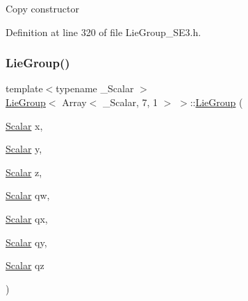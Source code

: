 Copy constructor 

Definition at line 320 of file Lie\+Group\+\_\+\+S\+E3.\+h.

\hypertarget{class_lie_group_3_01_array_3_01___scalar_00_017_00_011_01_4_01_4_aa26a8dec73f9a261d811ae4f31b7647f}{}\label{class_lie_group_3_01_array_3_01___scalar_00_017_00_011_01_4_01_4_aa26a8dec73f9a261d811ae4f31b7647f} 
\subsubsection{\texorpdfstring{Lie\+Group()}{LieGroup()}\hspace{0.1cm}{\footnotesize\ttfamily [4/6]}}
{\footnotesize\ttfamily template$<$typename \+\_\+\+Scalar $>$ \\
\hyperlink{class_lie_group}{Lie\+Group}$<$ Array$<$ \+\_\+\+Scalar, 7, 1 $>$ $>$\+::\hyperlink{class_lie_group}{Lie\+Group} (\begin{DoxyParamCaption}\item[{\hyperlink{class_lie_group_3_01_array_3_01___scalar_00_017_00_011_01_4_01_4_a5fd29a7be3621d5df2717d910d47b3ce}{Scalar}}]{x,  }\item[{\hyperlink{class_lie_group_3_01_array_3_01___scalar_00_017_00_011_01_4_01_4_a5fd29a7be3621d5df2717d910d47b3ce}{Scalar}}]{y,  }\item[{\hyperlink{class_lie_group_3_01_array_3_01___scalar_00_017_00_011_01_4_01_4_a5fd29a7be3621d5df2717d910d47b3ce}{Scalar}}]{z,  }\item[{\hyperlink{class_lie_group_3_01_array_3_01___scalar_00_017_00_011_01_4_01_4_a5fd29a7be3621d5df2717d910d47b3ce}{Scalar}}]{qw,  }\item[{\hyperlink{class_lie_group_3_01_array_3_01___scalar_00_017_00_011_01_4_01_4_a5fd29a7be3621d5df2717d910d47b3ce}{Scalar}}]{qx,  }\item[{\hyperlink{class_lie_group_3_01_array_3_01___scalar_00_017_00_011_01_4_01_4_a5fd29a7be3621d5df2717d910d47b3ce}{Scalar}}]{qy,  }\item[{\hyperlink{class_lie_group_3_01_array_3_01___scalar_00_017_00_011_01_4_01_4_a5fd29a7be3621d5df2717d910d47b3ce}{Scalar}}]{qz }\end{DoxyParamCaption})\hspace{0.3cm}{\ttfamily [inline]}}

